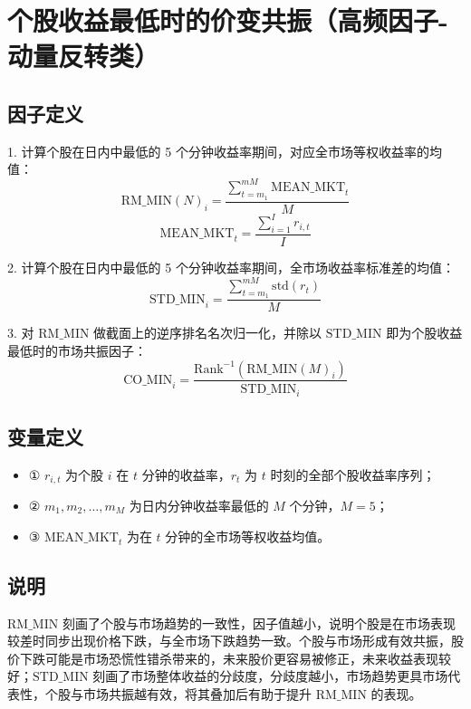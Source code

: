 \documentclass{article}
\begin{document}
\section{个股收益最低时的价变共振（高频因子-动量反转类）}

\subsection{因子定义}

1. 计算个股在日内中最低的 5 个分钟收益率期间，对应全市场等权收益率的均值：
\begin{equation}
    \mathrm{RM\_MIN}(N)_i = \frac{\sum_{t=m_1}^{mM} \mathrm{MEAN\_MKT}_t}{M}
\end{equation}
\begin{equation}
    \mathrm{MEAN\_MKT}_t = \frac{\sum_{i=1}^I r_{i,t}}{I}
\end{equation}

2. 计算个股在日内中最低的 5 个分钟收益率期间，全市场收益率标准差的均值：
\begin{equation}
    \mathrm{STD\_MIN}_i = \frac{\sum_{t=m_1}^{mM} \mathrm{std}(r_t)}{M}
\end{equation}

3. 对 \( \mathrm{RM\_MIN} \) 做截面上的逆序排名名次归一化，并除以 \( \mathrm{STD\_MIN} \) 即为个股收益最低时的市场共振因子：
\begin{equation}
    \mathrm{CO\_MIN}_i = \frac{\mathrm{Rank}^{-1}(\mathrm{RM\_MIN}(M)_i)}{\mathrm{STD\_MIN}_i}
\end{equation}

\subsection{变量定义}
\begin{itemize}
    \item ① \( r_{i,t} \) 为个股 \( i \) 在 \( t \) 分钟的收益率，\( r_t \) 为 \( t \) 时刻的全部个股收益率序列；
    \item ② \( m_1, m_2, \ldots, m_M \) 为日内分钟收益率最低的 \( M \) 个分钟，\( M=5 \)；
    \item ③ \( \mathrm{MEAN\_MKT}_t \) 为在 \( t \) 分钟的全市场等权收益均值。
\end{itemize}

\subsection{说明}
\( \mathrm{RM\_MIN} \) 刻画了个股与市场趋势的一致性，因子值越小，说明个股是在市场表现较差时同步出现价格下跌，与全市场下跌趋势一致。个股与市场形成有效共振，股价下跌可能是市场恐慌性错杀带来的，未来股价更容易被修正，未来收益表现较好；\( \mathrm{STD\_MIN} \) 刻画了市场整体收益的分歧度，分歧度越小，市场趋势更具市场代表性，个股与市场共振越有效，将其叠加后有助于提升 \( \mathrm{RM\_MIN} \) 的表现。
\end{document}
